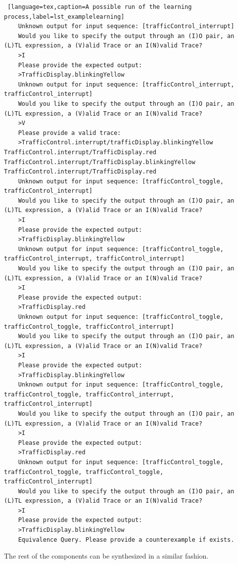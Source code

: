 \bigskip
\begin{lstlisting} [language=tex,caption=A possible run of the learning process,label=lst_examplelearning]
	Unknown output for input sequence: [trafficControl_interrupt]
	Would you like to specify the output through an (I)O pair, an (L)TL expression, a (V)alid Trace or an I(N)valid Trace?
	>I
	Please provide the expected output:
	>TrafficDisplay.blinkingYellow
	Unknown output for input sequence: [trafficControl_interrupt, trafficControl_interrupt]
	Would you like to specify the output through an (I)O pair, an (L)TL expression, a (V)alid Trace or an I(N)valid Trace?
	>V
	Please provide a valid trace:
	>TrafficControl.interrupt/trafficDisplay.blinkingYellow TrafficControl.interrupt/TrafficDisplay.red TrafficControl.interrupt/TrafficDisplay.blinkingYellow TrafficControl.interrupt/TrafficDisplay.red
	Unknown output for input sequence: [trafficControl_toggle, trafficControl_interrupt]
	Would you like to specify the output through an (I)O pair, an (L)TL expression, a (V)alid Trace or an I(N)valid Trace?
	>I
	Please provide the expected output:
	>TrafficDisplay.blinkingYellow
	Unknown output for input sequence: [trafficControl_toggle, trafficControl_interrupt, trafficControl_interrupt]
	Would you like to specify the output through an (I)O pair, an (L)TL expression, a (V)alid Trace or an I(N)valid Trace?
	>I
	Please provide the expected output:
	>TrafficDisplay.red
	Unknown output for input sequence: [trafficControl_toggle, trafficControl_toggle, trafficControl_interrupt]
	Would you like to specify the output through an (I)O pair, an (L)TL expression, a (V)alid Trace or an I(N)valid Trace?
	>I
	Please provide the expected output:
	>TrafficDisplay.blinkingYellow
	Unknown output for input sequence: [trafficControl_toggle, trafficControl_toggle, trafficControl_interrupt, trafficControl_interrupt]
	Would you like to specify the output through an (I)O pair, an (L)TL expression, a (V)alid Trace or an I(N)valid Trace?
	>I
	Please provide the expected output:
	>TrafficDisplay.red
	Unknown output for input sequence: [trafficControl_toggle, trafficControl_toggle, trafficControl_toggle, trafficControl_interrupt]
	Would you like to specify the output through an (I)O pair, an (L)TL expression, a (V)alid Trace or an I(N)valid Trace?
	>I
	Please provide the expected output:
	>TrafficDisplay.blinkingYellow
	Equivalence Query. Please provide a counterexample if exists.
\end{lstlisting}

The rest of the components can be synthesized in a similar fashion. 

